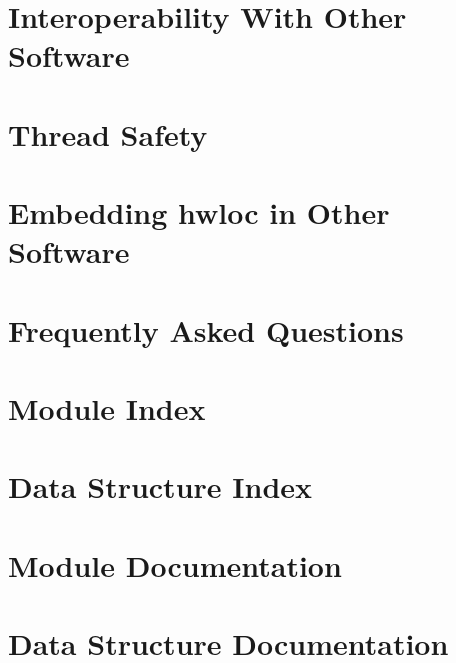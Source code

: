 \documentclass[a4paper]{book}
\begin{document}
\chapter{Interoperability With Other Software}
\label{interoperability}
\hypertarget{interoperability}{}

\chapter{Thread Safety}
\label{threadsafety}
\hypertarget{threadsafety}{}

\chapter{Embedding hwloc in Other Software}
\label{embed}
\hypertarget{embed}{}

\chapter{Frequently Asked Questions}
\label{faq}
\hypertarget{faq}{}

\chapter{Module Index}

\chapter{Data Structure Index}

\chapter{Module Documentation}





































\chapter{Data Structure Documentation}















\printindex
\end{document}
